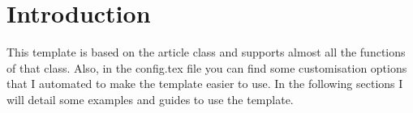 \section{Introduction}

This template is based on the article class and supports almost all the functions of that class. Also, in the config.tex file you can find some customisation options that I automated to make the template easier to use. In the following sections I will detail some examples and guides to use the template.